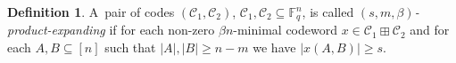\documentclass[11pt]{article}
\let\le\leqslant
\let\ge\geqslant
\theoremstyle{plain}
\theoremstyle{definition}
\newtheorem*{definition}{Definition}
\theoremstyle{remark}
\newcommand{\wt}{\mathbf{wt}}
\newcommand{\cC}{\mathcal{C}}
\newcommand{\F}{\mathbb{F}}
\begin{document}
\begin{definition}
A~pair of codes $(\cC_1, \cC_2)$, $\cC_1,\cC_2\subseteq \F_q^n$, is called \emph{$(s,m,\beta)$-product-expanding} if for each non-zero $\beta n$-minimal 
codeword $x\in \cC_1\boxplus \cC_2$ and for each $A, B\subseteq [n]$ such that %
$|A|,|B|\ge n-m$ we have $|x(A,B)|\ge s$.
\end{definition}
\end{document}
